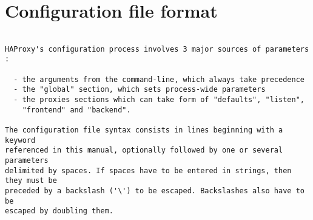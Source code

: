 
\section{Configuration file format}

\begin{verbatim}

HAProxy's configuration process involves 3 major sources of parameters :

  - the arguments from the command-line, which always take precedence
  - the "global" section, which sets process-wide parameters
  - the proxies sections which can take form of "defaults", "listen",
    "frontend" and "backend".

The configuration file syntax consists in lines beginning with a keyword
referenced in this manual, optionally followed by one or several parameters
delimited by spaces. If spaces have to be entered in strings, then they must be
preceded by a backslash ('\') to be escaped. Backslashes also have to be
escaped by doubling them.


\end{verbatim}
